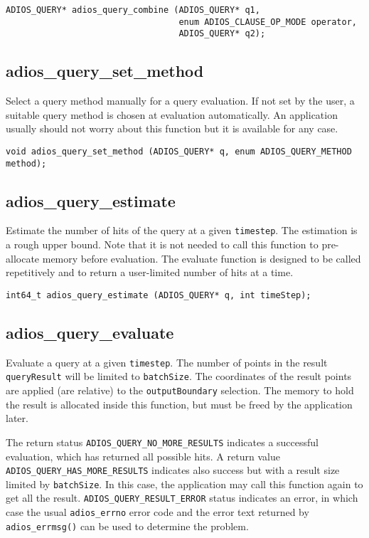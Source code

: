 \begin{lstlisting}[alsolanguage=C]
ADIOS_QUERY* adios_query_combine (ADIOS_QUERY* q1,
                                  enum ADIOS_CLAUSE_OP_MODE operator,
                                  ADIOS_QUERY* q2);
\end{lstlisting}

\subsection{adios\_query\_set\_method}
Select a query method manually for a query evaluation. If not set by the user, a suitable query method is chosen at evaluation automatically. An application usually should not worry about this function but it is available for any case. 

\begin{lstlisting}[alsolanguage=C]
void adios_query_set_method (ADIOS_QUERY* q, enum ADIOS_QUERY_METHOD method);
\end{lstlisting}

\subsection{adios\_query\_estimate}
Estimate the number of hits of the query at a given \verb+timestep+. The estimation is a rough upper bound. Note that it is not needed to call this function to pre-allocate memory before evaluation. The evaluate function is designed to be called repetitively and to return a user-limited number of hits at a time.

\begin{lstlisting}[alsolanguage=C]
int64_t adios_query_estimate (ADIOS_QUERY* q, int timeStep);
\end{lstlisting}

\subsection{adios\_query\_evaluate}
Evaluate a query at a given \verb+timestep+. The number of points in the result \verb+queryResult+ will be limited to \verb+batchSize+. The coordinates of the result points are applied (are relative) to the \verb+outputBoundary+ selection. The memory to hold the result is allocated inside this function, but must be freed by the application later. 

The return status \verb+ADIOS_QUERY_NO_MORE_RESULTS+  indicates a successful evaluation, which has returned all possible hits. A return value \verb+ADIOS_QUERY_HAS_MORE_RESULTS+ indicates also success but with a result size limited by \verb+batchSize+. In this case, the application may call this function again  to get all the result. \verb+ADIOS_QUERY_RESULT_ERROR+ status indicates an error, in which case the usual \verb+adios_errno+ error code and the error text returned by \verb+adios_errmsg()+ can be used to determine the problem.
 

